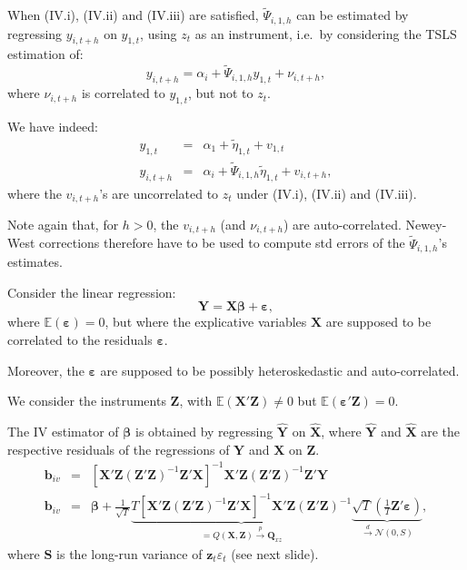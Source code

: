 \documentclass[
  12pt,
]{book}
\theoremstyle{definition}
\theoremstyle{definition}
\theoremstyle{definition}
\theoremstyle{definition}
\theoremstyle{remark}
\begin{document}
When (IV.i), (IV.ii) and (IV.iii) are satisfied, \(\tilde\Psi_{i,1,h}\) can be estimated by regressing \(y_{i,t+h}\) on \(y_{1,t}\), using \(z_t\) as an instrument, i.e.~by considering the TSLS estimation of:
\begin{equation}
y_{i,t+h} = \alpha_i + \tilde\Psi_{i,1,h}y_{1,t} + \nu_{i,t+h},\label{eq:regIV1}
\end{equation}
where \(\nu_{i,t+h}\) is correlated to \(y_{1,t}\), but not to \(z_t\).

We have indeed:
\begin{eqnarray*}
y_{1,t} &=& \alpha_1 + \tilde\eta_{1,t} + v_{1,t}\\
y_{i,t+h} &=& \alpha_i + \tilde\Psi_{i,1,h}\tilde\eta_{1,t} + v_{i,t+h},
\end{eqnarray*}
where the \(v_{i,t+h}\)'s are uncorrelated to \(z_t\) under (IV.i), (IV.ii) and (IV.iii).

Note again that, for \(h>0\), the \(v_{i,t+h}\) (and \(\nu_{i,t+h}\)) are auto-correlated. Newey-West corrections therefore have to be used to compute std errors of the \(\tilde\Psi_{i,1,h}\)'s estimates.

Consider the linear regression:
\[
\mathbf{Y} = \mathbf{X}\boldsymbol\beta + \boldsymbol\varepsilon,
\]
where \(\mathbb{E}(\boldsymbol\varepsilon)=0\), but where the explicative variables \(\mathbf{X}\) are supposed to be correlated to the residuals \(\boldsymbol\varepsilon\).

Moreover, the \(\boldsymbol\varepsilon\) are supposed to be possibly heteroskedastic and auto-correlated.

We consider the instruments \(\mathbf{Z}\), with \(\mathbb{E}(\mathbf{X}'\mathbf{Z}) \ne 0\) but \(\mathbb{E}(\boldsymbol\varepsilon'\mathbf{Z}) = 0\).

The IV estimator of \(\boldsymbol\beta\) is obtained by regressing \(\hat{\mathbf{Y}}\) on \(\hat{\mathbf{X}}\), where \(\hat{\mathbf{Y}}\) and \(\hat{\mathbf{X}}\) are the respective residuals of the regressions of \(\mathbf{Y}\) and \(\mathbf{X}\) on \(\mathbf{Z}\).
\begin{eqnarray*}
\mathbf{b}_{iv} &=& [\mathbf{X}'\mathbf{Z}(\mathbf{Z}'\mathbf{Z})^{-1}\mathbf{Z}'\mathbf{X}]^{-1}\mathbf{X}'\mathbf{Z}(\mathbf{Z}'\mathbf{Z})^{-1}\mathbf{Z}'\mathbf{Y}\\
\mathbf{b}_{iv} &=& \boldsymbol\beta + \frac{1}{\sqrt{T}}\underbrace{T[\mathbf{X}'\mathbf{Z}(\mathbf{Z}'\mathbf{Z})^{-1}\mathbf{Z}'\mathbf{X}]^{-1}\mathbf{X}'\mathbf{Z}(\mathbf{Z}'\mathbf{Z})^{-1}}_{=Q(\mathbf{X},\mathbf{Z}) \overset{p}{\rightarrow} \mathbf{Q}_{xz}}\underbrace{\sqrt{T}\left(\frac{1}{T}\mathbf{Z}'\boldsymbol\varepsilon\right)}_{\overset{d}{\rightarrow} \mathcal{N}(0,S)},
\end{eqnarray*}
where \(\mathbf{S}\) is the long-run variance of \(\mathbf{z}_t\varepsilon_t\) (see next slide).
\end{document}
